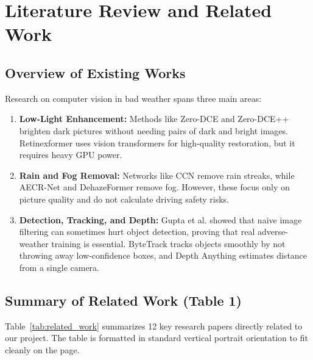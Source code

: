 \documentclass{article}
\begin{document}
\newpage
\section{Literature Review and Related Work}
\label{sec:literature_review}

\subsection{Overview of Existing Works}
Research on computer vision in bad weather spans three main areas:
\begin{enumerate}
    \item \textbf{Low-Light Enhancement:} Methods like Zero-DCE \cite{guo2020zero} and Zero-DCE++ \cite{li2021zero} brighten dark pictures without needing pairs of dark and bright images. Retinexformer \cite{cai2023retinexformer} uses vision transformers for high-quality restoration, but it requires heavy GPU power.
    \item \textbf{Rain and Fog Removal:} Networks like CCN \cite{quan2021ccn} remove rain streaks, while AECR-Net \cite{wu2021aecrnet} and DehazeFormer \cite{song2023dehazeformer} remove fog. However, these focus only on picture quality and do not calculate driving safety risks.
    \item \textbf{Detection, Tracking, and Depth:} Gupta et al. \cite{gupta2024robust} showed that naive image filtering can sometimes hurt object detection, proving that real adverse-weather training is essential. ByteTrack \cite{zhang2022bytetrack} tracks objects smoothly by not throwing away low-confidence boxes, and Depth Anything \cite{yang2024depth} estimates distance from a single camera.
\end{enumerate}

\subsection{Summary of Related Work (Table 1)}
Table~\ref{tab:related_work} summarizes 12 key research papers directly related to our project. The table is formatted in standard vertical portrait orientation to fit cleanly on the page.
\end{document}
